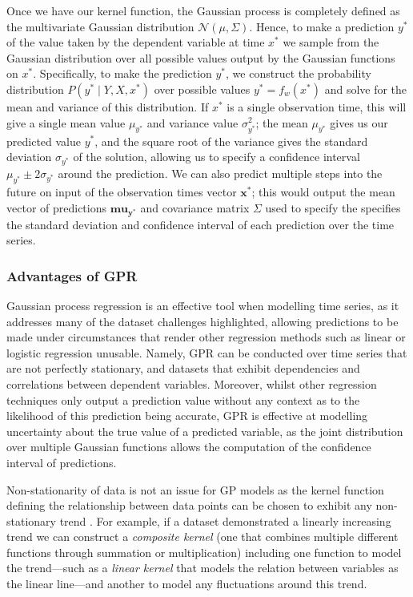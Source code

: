 \documentclass[a4paper, 11pt]{article}
\begin{document}
    Once we have our kernel function, the Gaussian process is completely defined as the multivariate Gaussian distribution $\mathcal{N}(\mu, \Sigma)$. Hence, to make a prediction $y^*$ of the value taken by the dependent variable at time $x^*$ we sample from the Gaussian distribution over all possible values output by the Gaussian functions on $x^*$. Specifically, to make the prediction $y^*$, we construct the probability distribution $P(y^* \mid Y, X, x^*)$ over possible values $y^* = f_w(x^*)$ and solve for the mean and variance of this distribution. If $x^*$ is a single observation time, this will give a single mean value $\mu_{y^*}$ and variance value $\sigma^2_{y^*}$; the mean $\mu_{y^*}$ gives us our predicted value $y^*$, and the square root of the variance gives the standard deviation $\sigma_{y^*}$ of the solution, allowing us to specify a confidence interval $\mu_{y^*} \pm 2 \sigma_{y^*}$ around the prediction. We can also predict multiple steps into the future on input of the observation times vector $\mathbf{x^*}$; this would output the mean vector of predictions $\mathbf{mu_{y^*}}$ and covariance matrix $\Sigma$ used to specify the specifies the standard deviation and confidence interval of each prediction over the time series.

    \subsubsection{Advantages of GPR}

    Gaussian process regression is an effective tool when modelling time series, as it addresses many of the dataset challenges highlighted, allowing predictions to be made under circumstances that render other regression methods such as linear or logistic regression unusable. Namely, GPR can be conducted over time series that are not perfectly stationary, and datasets that exhibit dependencies and correlations between dependent variables. Moreover, whilst other regression techniques only output a prediction value without any context as to the likelihood of this prediction being accurate, GPR is effective at modelling uncertainty about the true value of a predicted variable, as the joint distribution over multiple Gaussian functions allows the computation of the confidence interval of predictions.

    Non-stationarity of data is not an issue for GP models as the kernel function defining the relationship between data points can be chosen to exhibit any non-stationary trend \cite{bitvai-2016}. For example, if a dataset demonstrated a linearly increasing trend we can construct a \emph{composite kernel} (one that combines multiple different functions through summation or multiplication) including one function to model the trend---such as a \emph{linear kernel} that models the relation between variables as the linear line---and another to model any fluctuations around this trend.
\end{document}

